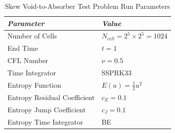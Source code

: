 \begin{table}[ht]\caption{Skew Void-to-Absorber Test Problem Run Parameters}
\label{tab:skew_void_to_absorber_run_parameters}
\centering
\begin{tabular}{l l}\toprule
\emph{Parameter} & \emph{Value}\\\midrule
Number of Cells & $N_{cell} = 2^5 \times 2^5 = 1024$\\
End Time & $t = 1$\\
CFL Number & $\nu = 0.5$\\
Time Integrator & SSPRK33\\\midrule
Entropy Function & $E(u) = \frac{1}{2}u^2$\\
Entropy Residual Coefficient & $c_E = 0.1$\\
Entropy Jump Coefficient & $c_J = 0.1$\\
Entropy Time Integrator & BE\\
\bottomrule\end{tabular}
\end{table}
